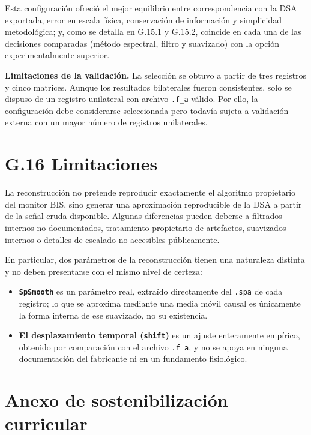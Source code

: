 \documentclass[
  spanish,
  a4paper,
  12pt,
  twoside]{memoir}
\providecommand{\tightlist}{%
  \setlength{\itemsep}{0pt}\setlength{\parskip}{0pt}}
\newcommand{\apendice}[1]{\chapter{#1}}
\begin{document}
Esta configuración ofreció el mejor equilibrio entre correspondencia con
la DSA exportada, error en escala física, conservación de información y
simplicidad metodológica; y, como se detalla en G.15.1 y G.15.2,
coincide en cada una de las decisiones comparadas (método espectral,
filtro y suavizado) con la opción experimentalmente superior.

\textbf{Limitaciones de la validación.} La selección se obtuvo a partir
de tres registros y cinco matrices. Aunque los resultados bilaterales
fueron consistentes, solo se dispuso de un registro unilateral con
archivo \texttt{.f\_a} válido. Por ello, la configuración debe
considerarse seleccionada pero todavía sujeta a validación externa con
un mayor número de registros unilaterales.

\chapter{G.16 Limitaciones}\label{g.16-limitaciones}

La reconstrucción no pretende reproducir exactamente el algoritmo
propietario del monitor BIS, sino generar una aproximación reproducible
de la DSA a partir de la señal cruda disponible. Algunas diferencias
pueden deberse a filtrados internos no documentados, tratamiento
propietario de artefactos, suavizados internos o detalles de escalado no
accesibles públicamente.

En particular, dos parámetros de la reconstrucción tienen una naturaleza
distinta y no deben presentarse con el mismo nivel de certeza:

\begin{itemize}
\tightlist
\item
  \textbf{\texttt{SpSmooth}} es un parámetro real, extraído directamente
  del \texttt{.spa} de cada registro; lo que se aproxima mediante una
  media móvil causal es únicamente la forma interna de ese suavizado, no
  su existencia.
\item
  \textbf{El desplazamiento temporal (\texttt{shift})} es un ajuste
  enteramente empírico, obtenido por comparación con el archivo
  \texttt{.f\_a}, y no se apoya en ninguna documentación del fabricante
  ni en un fundamento fisiológico.
\end{itemize}


\apendice{Anexo de sostenibilización curricular}
\end{document}
